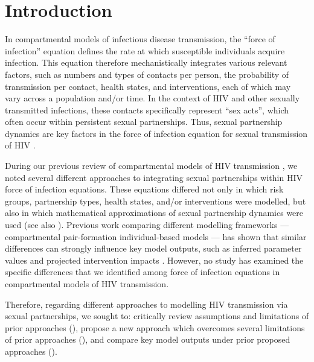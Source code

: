 \section{Introduction}\label{intro}
In compartmental models of infectious disease transmission,
the ``force of infection'' equation defines
the rate at which susceptible individuals acquire infection.
This equation therefore mechanistically integrates various relevant factors, such as
numbers and types of contacts per person,
the probability of transmission per contact,
health states, and interventions,
each of which may vary across a population and/or time.
In the context of HIV and other sexually transmitted infections,
these contacts specifically represent ``sex acts'',
which often occur within persistent sexual partnerships.
Thus, sexual partnership dynamics are key factors in
the force of infection equation for sexual transmission of HIV \cite{Rao2021}.
\par
During our previous review of compartmental models of HIV transmission \cite{Knight2022sr},
we noted several different approaches to integrating sexual partnerships
within HIV force of infection equations.
These equations differed not only in which
risk groups, partnership types, health states, and/or interventions were modelled,
but also in which mathematical approximations of sexual partnership dynamics were used
(see also \cite{Rao2021}).
Previous work comparing different modelling frameworks
--- \ie compartmental \vs pair-formation \vs individual-based models ---
has shown that similar differences can strongly influence key model outputs,
such as inferred parameter values and projected intervention impacts
\cite{Kretzschmar1998,Eames2002,Lloyd-Smith2004,Johnson2016mf}.
However, no study has examined the specific differences that we identified
among force of infection equations in compartmental models of HIV transmission.
\par
Therefore, regarding different approaches to modelling HIV transmission via sexual partnerships,
we sought to:
critically review assumptions and limitations of prior approaches (),
propose a new approach which overcomes several limitations of prior approaches (),
and compare key model outputs under prior \vs proposed approaches ().
